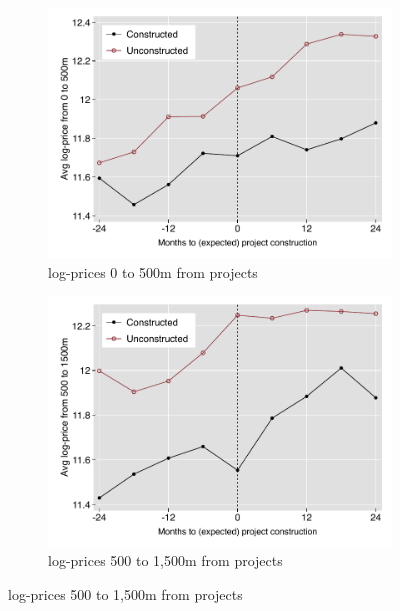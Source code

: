 \documentclass[12pt]{article}
\begin{document}
\begin{figure}[t!]
        \centering
        \caption[ Average house prices before and after expected construction ]
        {\small Average house prices before and after expected construction } 
        \begin{subfigure}[b]{0.495\textwidth}
            \centering
            \includegraphics[width=\textwidth,trim={0.9cm .3cm 0.1cm 0cm}, clip=true]{figures/price_pretrends_close__4}
            \caption[Network2]%
            {{\small log-prices 0 to 500m from projects}}    
            \label{fig:pretrend_close}
        \end{subfigure}
        \hfill
        \begin{subfigure}[b]{0.495\textwidth}   
            \centering 
            \includegraphics[width=\textwidth,trim={0.9cm .3cm 0.1cm 0cm}, clip=true]{figures/price_pretrends_far__4}
            \caption[]%
            {{\small log-prices 500 to 1,500m from projects}}    
            \label{fig:pretrend_far}
        \end{subfigure}
        \label{fig:pretrend}
        \vspace{-6mm}
\end{figure} 
\end{document}
